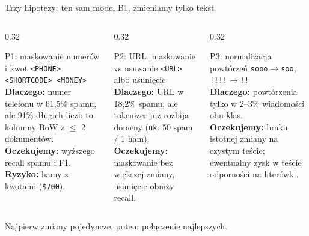 \documentclass[aspectratio=169,10pt]{beamer}
\begin{document}
\begin{frame}{Trzy hipotezy: ten sam model B1, zmieniamy tylko tekst}
  \small
  \begin{columns}[T]
    \begin{column}{0.32\textwidth}
      \begin{block}{P1: maskowanie numerów i kwot}
        \texttt{<PHONE> <SHORTCODE> <MONEY>}\\[0.4em]
        \textbf{Dlaczego:} numer telefonu w 61,5\% spamu, ale 91\% długich liczb to kolumny BoW z $\leq$ 2 dokumentów.\\[0.4em]
        \textbf{Oczekujemy:} wyższego recall spamu i F1.\\[0.4em]
        \textbf{Ryzyko:} hamy z kwotami (\texttt{\$700}).
      \end{block}
    \end{column}
    \begin{column}{0.32\textwidth}
      \begin{block}{P2: URL, maskowanie vs usuwanie}
        \texttt{<URL>} albo usunięcie\\[0.4em]
        \textbf{Dlaczego:} URL w 18,2\% spamu, ale tokenizer już rozbija domeny (\texttt{uk}: 50 spam / 1 ham).\\[0.4em]
        \textbf{Oczekujemy:} maskowanie bez większej zmiany, usunięcie obniży recall.
      \end{block}
    \end{column}
    \begin{column}{0.32\textwidth}
      \begin{block}{P3: normalizacja powtórzeń}
        \texttt{sooo}$\to$\texttt{soo}, \texttt{!!!!}$\to$\texttt{!!}\\[0.4em]
        \textbf{Dlaczego:} powtórzenia tylko w 2--3\% wiadomości obu klas.\\[0.4em]
        \textbf{Oczekujemy:} braku istotnej zmiany na czystym teście; ewentualny zysk w teście odporności na literówki.
      \end{block}
    \end{column}
  \end{columns}
  \vspace{0.8em}
  Najpierw zmiany pojedyncze, potem połączenie najlepszych.
\end{frame}
\end{document}
